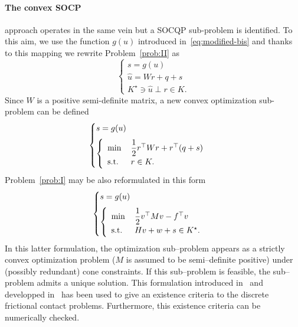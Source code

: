 \paragraph{ The convex SOCP} approach operates in the same vein but a  SOCQP sub-problem is identified. To this aim, we use the function $g(u)$ introduced in~\eqref{eq:modified-bis} and thanks to this mapping we rewrite Problem~\ref{prob:II} as
\begin{equation}\label{eq:ACLM-2}
  \begin{cases}
    s = g(u) \\[2mm]
    \hat u = W r + q + s  \\[2mm]
    K^\star \ni {\hat u} \perp r \in K.
  \end{cases}
\end{equation} 
Since $W$ is a positive semi-definite matrix, a new convex optimization sub-problem can be defined 
\begin{equation}\label{eq:ACLM-3}
  \begin{cases}
    s = g(u) \\[2mm]
    \left\{
      \begin{array}{ll}
        \min\,&\Frac 1 2 r^\top W r + r^\top (q + s)  \\
        \text{s.t. } & r \in K.
      \end{array}
    \right.
  \end{cases}
\end{equation} 
Problem~\ref{prob:I} may be also reformulated in this form
\begin{equation}\label{eq:ACLM-4}
  \begin{cases}
    s = g(u) \\[2mm]
    \left\{
      \begin{array}{ll}
        \min\,&\Frac 1 2 v^\top M v -  f^\top v  \\
        \text{s.t. } & H v  + w + s  \in K^\star.
      \end{array}
    \right.
  \end{cases}
\end{equation} 
In this latter formulation, the optimization sub--problem appears as a strictly convex optimization problem ($M$ is assumed to be semi--definite positive) under (possibly redundant) cone constraints. If this sub--problem is feasible, the sub--problem admits a unique solution. This formulation introduced in~\cite{Cadoux2009} and developped in~\cite{Acary.Cadoux2013,Acary.ea_ZAMM2011} has been used to give an existence criteria to the discrete frictional contact problems. Furthermore, this existence criteria can be numerically checked. 
\clearpage

